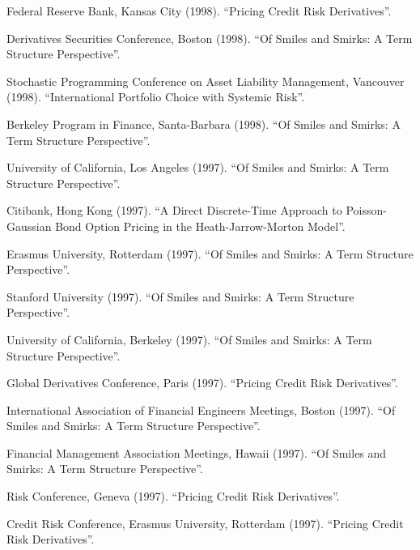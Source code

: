 \documentclass{article}
\begin{document}
\begin{etaremune}
{\item Federal Reserve Bank, Kansas City (1998). 
``Pricing Credit Risk Derivatives''.

\item Derivatives Securities Conference, Boston (1998).
``Of Smiles and Smirks: A Term Structure Perspective''. 

\item Stochastic Programming Conference on Asset Liability Management,
Vancouver (1998).
``International Portfolio Choice with Systemic Risk''.

\item Berkeley Program in Finance, Santa-Barbara (1998).
``Of Smiles and Smirks: A Term Structure Perspective''. 

\item University of California, Los Angeles (1997).
``Of Smiles and Smirks: A Term Structure Perspective''. 

\item Citibank, Hong Kong (1997). 
``A Direct Discrete-Time Approach to
Poisson-Gaussian Bond Option Pricing in the Heath-Jarrow-Morton 
Model''. 

\item Erasmus University, Rotterdam (1997). 
``Of Smiles and Smirks: A Term Structure Perspective''. 

\item Stanford University (1997).
``Of Smiles and Smirks: A Term Structure Perspective''. 

\item University of California, Berkeley (1997).
``Of Smiles and Smirks: A Term Structure Perspective''. 

\item Global Derivatives Conference, Paris (1997).
``Pricing Credit Risk Derivatives''.

\item International Association of Financial Engineers Meetings, Boston (1997).
``Of Smiles and Smirks: A Term Structure Perspective''. 

\item Financial Management Association Meetings, Hawaii (1997).
``Of Smiles and Smirks: A Term Structure Perspective''. 

\item Risk Conference, Geneva (1997).
``Pricing Credit Risk Derivatives''.

\item Credit Risk Conference, Erasmus University, Rotterdam (1997).
``Pricing Credit Risk Derivatives''.

}
\end{etaremune}
\end{document}

